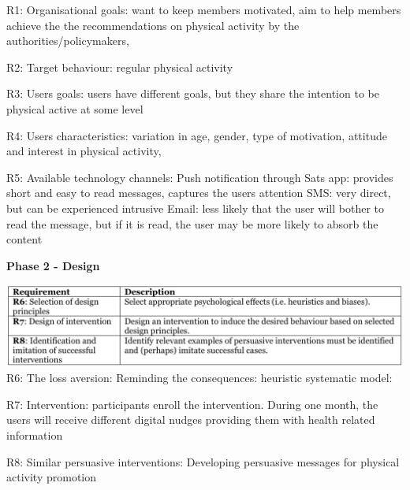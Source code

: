 R1: 
Organisational goals: want to keep members motivated, aim to help members achieve the the recommendations on physical activity by the authorities/policymakers, 

R2: 
Target behaviour: regular physical activity 

R3:
Users goals: users have different goals, but they share the intention to be physical active at some level 

R4: 
Users characteristics: variation in age, gender, type of motivation, attitude and interest in physical activity,

R5: 
Available technology channels: 
Push notification through Sats app: provides short and easy to read messages, captures the users attention
SMS: very direct, but can be experienced intrusive 
Email: less likely that the user will bother to read the message, but if it is read, the user may be more likely to absorb the content

\textbf{Phase 2 - Design }

\includegraphics[width=1\textwidth]{images/Phase2.png}
\bigbreak
R6: 
The loss aversion: 
Reminding the consequences: 
heuristic systematic model: 

R7:
Intervention: participants enroll the intervention. During one month, the users will receive different digital nudges providing them with health related information 

R8: 
Similar persuasive interventions: 
Developing persuasive messages for physical activity promotion
 

